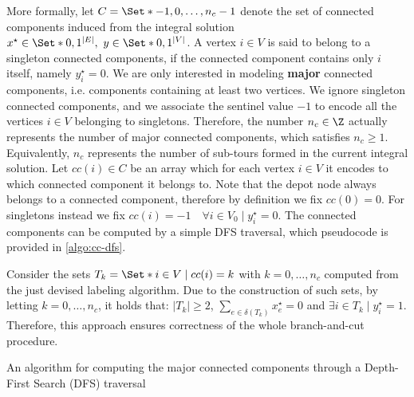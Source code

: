 More formally,
let $C = \Set*{-1, 0, \dots, n_c - 1}$ denote the set of connected components
induced from the integral solution $x^\star \in \Set*{0, 1}^{|E|},\ y \in \Set*{0, 1}^{|V|}$.
A vertex $i \in V$ is said to belong to a singleton connected components,
if the connected component contains only $i$ itself, namely $y^\star_i = 0$.
We are only interested in modeling \textbf{major} connected components,
i.e. components containing at least two vertices.
We ignore singleton connected components,
and we associate the sentinel value $-1$ to encode all the vertices $i \in V$ belonging to singletons.
Therefore, the number $n_c \in \Z$ actually represents the number
of major connected components, which satisfies $n_c \ge 1$.
Equivalently,
$n_c$ represents the number of sub-tours formed in the current integral solution.
Let $cc(i) \in C$ be an array
which for each vertex $i \in V$ it encodes to which connected component it belongs to.
Note that the depot node always belongs to a connected component,
therefore by definition we fix $cc(0) = 0$.
For singletons instead we fix $cc(i) = -1  \quad \forall i \in V_0 \mid y^\star_i = 0$.
The connected components can be computed
by a simple DFS traversal, which pseudocode is provided in \cref{algo:cc-dfs}.

Consider the sets $T_k = \Set*{i \in V \mid cc(i) = k}$ with $k = 0, \dots, n_c$
computed from the just devised labeling algorithm.
Due to the construction of such sets,
by letting $k = 0, \dots, n_c$,
it holds that:
$|T_k| \ge 2$,
$\sum_{e \in \delta(T_k)} x^\star_e = 0$
and $\exists i \in T_k \mid y^\star_i = 1$.
Therefore, this approach ensures correctness of the whole branch-and-cut procedure.


\begin{algorithm}
	\caption{An algorithm for computing the major connected components through a Depth-First Search (DFS) traversal}
	
	\label{algo:cc-dfs}
\end{algorithm}


